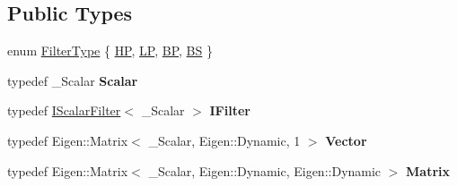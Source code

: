 \subsection*{Public Types}
\begin{DoxyCompactItemize}
\item 
enum \hyperlink{classow__core_1_1ScalarButterWorthFilter_aa2ad57d5d67aa7bb2310a52d6e35c0af}{Filter\+Type} \{ \hyperlink{classow__core_1_1ScalarButterWorthFilter_aa2ad57d5d67aa7bb2310a52d6e35c0afa3d5f827ba459e18d6e2226e833f30a6e}{HP}, 
\hyperlink{classow__core_1_1ScalarButterWorthFilter_aa2ad57d5d67aa7bb2310a52d6e35c0afa47394b33f3175a7d46009fd0ad40ff09}{LP}, 
\hyperlink{classow__core_1_1ScalarButterWorthFilter_aa2ad57d5d67aa7bb2310a52d6e35c0afa17275ddbb8598ef86e96d0c59135d177}{BP}, 
\hyperlink{classow__core_1_1ScalarButterWorthFilter_aa2ad57d5d67aa7bb2310a52d6e35c0afae77feb730664507508ec13f7fced7206}{BS}
 \}
\item 
typedef \+\_\+\+Scalar {\bfseries Scalar}\hypertarget{classow__core_1_1ScalarButterWorthFilter_a18a92bd79a688bf3dc12e15fa494ae24}{}\label{classow__core_1_1ScalarButterWorthFilter_a18a92bd79a688bf3dc12e15fa494ae24}

\item 
typedef \hyperlink{classow__core_1_1IScalarFilter}{I\+Scalar\+Filter}$<$ \+\_\+\+Scalar $>$ {\bfseries I\+Filter}\hypertarget{classow__core_1_1ScalarButterWorthFilter_a9f6b0138be14ee9c3dc76fc07ecdc748}{}\label{classow__core_1_1ScalarButterWorthFilter_a9f6b0138be14ee9c3dc76fc07ecdc748}

\item 
typedef Eigen\+::\+Matrix$<$ \+\_\+\+Scalar, Eigen\+::\+Dynamic, 1 $>$ {\bfseries Vector}\hypertarget{classow__core_1_1ScalarButterWorthFilter_a9a6c1af6ba526c8376e0c58268567f7f}{}\label{classow__core_1_1ScalarButterWorthFilter_a9a6c1af6ba526c8376e0c58268567f7f}

\item 
typedef Eigen\+::\+Matrix$<$ \+\_\+\+Scalar, Eigen\+::\+Dynamic, Eigen\+::\+Dynamic $>$ {\bfseries Matrix}\hypertarget{classow__core_1_1ScalarButterWorthFilter_a5f8538a0c9c132ab00bcd35fd2886171}{}\label{classow__core_1_1ScalarButterWorthFilter_a5f8538a0c9c132ab00bcd35fd2886171}

\end{DoxyCompactItemize}
